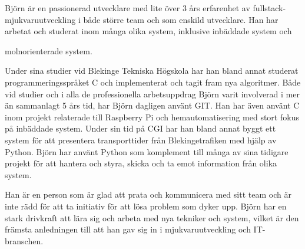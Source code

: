 Björn är en passionerad utvecklare med lite över 3 års erfarenhet av fullstack-mjukvaruutveckling 
i både större team och som enskild utvecklare. Han har arbetat och studerat inom många olika system, 
inklusive inbäddade system och 

molnorienterade system.

\vspace{10pt}
Under sina studier vid Blekinge Tekniska Högskola har han bland annat studerat programmeringsspråket C 
och implementerat och tagit fram nya algoritmer. Både vid studier och i alla de professionella arbetsuppdrag 
Björn varit involverad i mer än sammanlagt 5 års tid, har Björn dagligen använt GIT. Han har även använt C 
inom projekt relaterade till Raspberry Pi och hemautomatisering med stort fokus på inbäddade system. 
Under sin tid på CGI har han bland annat byggt ett system för att presentera transporttider från 
Blekingetrafiken med hjälp av Python. Björn har använt Python som komplement till många av sina 
tidigare projekt för att hantera och styra, skicka och ta emot information från olika system.

\vspace{10pt}
Han är en person som är glad att prata och kommunicera med sitt team och är inte rädd för att ta 
initiativ för att lösa problem som dyker upp. Björn har en stark drivkraft att lära sig och arbeta 
med nya tekniker och system, vilket är den främsta anledningen till att han gav sig in i 
mjukvaruutveckling och IT-branschen.